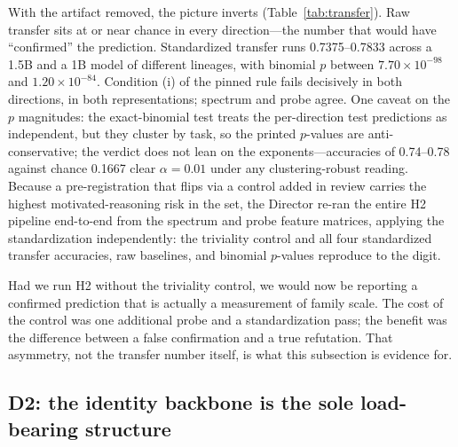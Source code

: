 \documentclass[10pt]{article}
\begin{document}
With the artifact removed, the picture inverts (Table~\ref{tab:transfer}).
Raw transfer sits at or near chance in every direction---the number that
would have ``confirmed'' the prediction. Standardized transfer runs
0.7375--0.7833 across a 1.5B and a 1B model of different lineages, with
binomial $p$ between $7.70\times10^{-98}$ and $1.20\times10^{-84}$.
Condition (i) of the pinned rule fails decisively in both directions, in
both representations; spectrum and probe agree. One caveat on the $p$
magnitudes: the exact-binomial test treats the per-direction test
predictions as independent, but they cluster by task, so the printed
$p$-values are anti-conservative; the verdict does not lean on the
exponents---accuracies of 0.74--0.78 against chance 0.1667 clear
$\alpha = 0.01$ under any clustering-robust reading.
Because a pre-registration that flips via a control added in review
carries the highest motivated-reasoning risk in the set, the Director
re-ran the entire H2 pipeline end-to-end from the spectrum and probe
feature matrices, applying the standardization independently: the
triviality control and all four standardized transfer accuracies, raw
baselines, and binomial $p$-values reproduce to the digit.

Had we run H2 without the triviality control, we would now be reporting a
confirmed prediction that is actually a measurement of family scale. The
cost of the control was one additional probe and a standardization pass;
the benefit was the difference between a false confirmation and a true
refutation. That asymmetry, not the transfer number itself, is what this
subsection is evidence for.

\subsection{D2: the identity backbone is the sole load-bearing structure}
\label{sec:d2}
\end{document}
